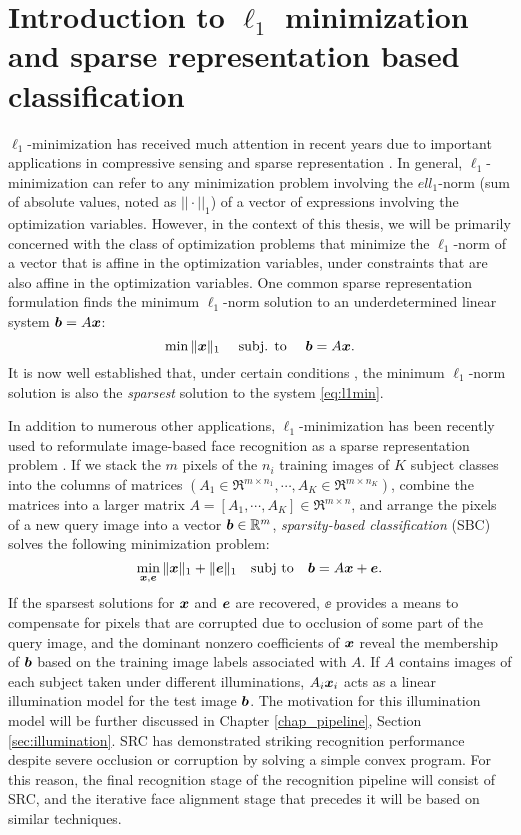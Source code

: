 \section{Introduction to $\ell_1$ minimization and sparse representation based classification}
%
$\ell_1$-minimization has received much attention in recent years due to
important applications in compressive sensing \cite{BrucksteinA2007} and sparse
representation \cite{WrightJ2010-PIEEE}.  
In general, $\ell_1$-minimization can refer to any minimization problem involving the 
$ell_1$-norm (sum of absolute values, noted as $||\cdot||_1$) of a vector of expressions involving the optimization
variables. However, in the context of this thesis, we will be primarily concerned with
the class of optimization problems that minimize the $\ell_1$-norm of a vector that
is affine in the optimization variables, under constraints that are also affine in the optimization variables.
One common sparse representation formulation finds the minimum $\ell_1$-norm solution to an
underdetermined linear system $\boldsymbol{b}=A{\boldsymbol{x}}$:
%
\begin{equation} \min \|{\boldsymbol{x}}\|_1\quad \mbox{ subj. to }\quad \boldsymbol{b} = A{\boldsymbol{x}}.
\label{eq:l1min} \end{equation}
%
It is now well established that, under certain conditions
\cite{CandesE2005-IT_1,DonohoD2004}, the minimum $\ell_1$-norm solution is also
the \emph{sparsest} solution to the system \eqref{eq:l1min}.

In addition to numerous other applications, $\ell_1$-minimization has been recently used to reformulate
image-based face recognition as a sparse representation problem
\cite{WrightJ2009-PAMI}.  If we stack the $m$ pixels of the $n_i$ training images of $K$ subject
classes into the columns of matrices $(A_1\in\Re^{m\times n_1}, \cdots, A_K\in\Re^{m\times n_K})$, combine
the matrices into a larger matrix $A = [A_1, \cdots, A_K]\in\Re^{m\times n}$, and arrange the pixels of a new
query image into a vector $\boldsymbol{b}\in\mathbb R^m$, \emph{sparsity-based
classification} (SBC) solves the following minimization problem:
\begin{equation}
\min_{{\boldsymbol{x}}, {\boldsymbol{e}}} \| {\boldsymbol{x}} \|_1 + \|{\boldsymbol{e}}\|_1 \quad \textup{subj to} \quad \boldsymbol{b} = A {\boldsymbol{x}} + {\boldsymbol{e}}.
\label{eq:l1min_denoise}
\end{equation}
If the sparsest solutions for ${\boldsymbol{x}}$ and $\boldsymbol{e}$ are recovered, $\ee$ provides a
means to compensate for pixels that are corrupted due to occlusion of some part of the query
image, and the dominant nonzero coefficients of ${\boldsymbol{x}}$ reveal the membership of
$\boldsymbol{b}$ based on the training image labels associated with $A$. 
If $A$ contains images of each subject taken under different illuminations, 
$A_i{\boldsymbol{x}}_i$ acts as a linear illumination model for the test image $\boldsymbol{b}$.  The motivation
for this illumination model will be further discussed in Chapter \ref{chap_pipeline}, Section \ref{sec:illumination}.
SRC has demonstrated striking recognition performance
despite severe occlusion or corruption by solving a simple convex program.  For
this reason, the final recognition stage of the recognition pipeline will consist of
SRC, and the iterative face alignment stage that precedes it will be based on
similar techniques.

